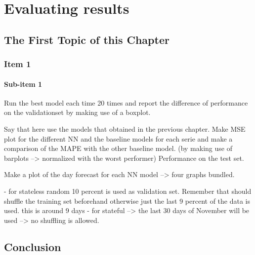 \chapter{Evaluating results}
\label{cha:Evaluating results}


\section{The First Topic of this Chapter}
\subsection{Item 1}
\subsubsection{Sub-item 1}

Run the best model each time 20 times and report the difference of  performance on the validationset by making use of a boxplot. 


Say that here use the models that obtained in the previous chapter. Make MSE plot for the different NN and the baseline models for each serie and make a comparison of the MAPE with the other baseline model. (by making use of barplots --> normalized with the worst performer) Performance on the test set. 

Make a plot of the day forecast for each NN model --> four graphs bundled. 

- for stateless random 10 percent is used as validation set. Remember that should shuffle the training set beforehand otherwise just the last 9 percent of the data is used. this is around 9 days
- for stateful --> the last 30 days of November will be used --> no shuffling is allowed.

\section{Conclusion}
\lipsum[86-88]

